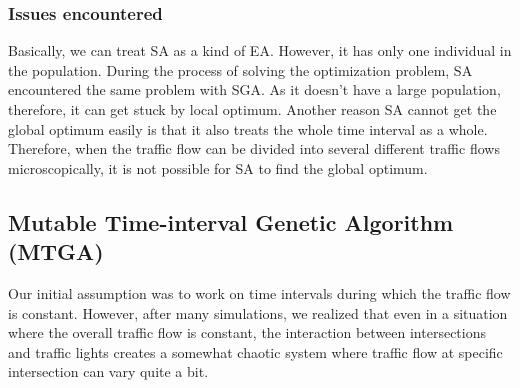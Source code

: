 \documentclass{article} %
\begin{document}
\subsubsection{Issues encountered}
Basically, we can treat SA as a kind of EA. However, it has only one individual in the population. During the process of solving the optimization problem, SA encountered the same problem with SGA. As it doesn't have a large population, therefore, it can get stuck by local optimum. Another reason SA cannot get the global optimum easily is that it also treats the whole time interval as a whole. Therefore, when the traffic flow can be divided into several different traffic flows microscopically, it is not possible for SA to find the global optimum. 


\subsection{Mutable Time-interval Genetic Algorithm (MTGA)}
Our initial assumption was to work on time intervals during which the traffic flow is constant. However, after many simulations, we realized that even in a situation where the overall traffic flow is constant, the interaction between intersections and traffic lights creates a somewhat chaotic system where traffic flow at specific intersection can vary quite a bit. 
\end{document}
